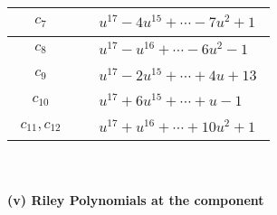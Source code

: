 \documentclass[1p]{elsarticle_modified}
\theoremstyle{definition}
\begin{document}
\begin{tabular}{m{50pt}|m{274pt}}
\hline $$\begin{aligned}c_{7}\end{aligned}$$&$\begin{aligned}
&u^{17}-4 u^{15}+\cdots-7 u^2+1
\end{aligned}$\\
\hline $$\begin{aligned}c_{8}\end{aligned}$$&$\begin{aligned}
&u^{17}- u^{16}+\cdots-6 u^2-1
\end{aligned}$\\
\hline $$\begin{aligned}c_{9}\end{aligned}$$&$\begin{aligned}
&u^{17}-2 u^{15}+\cdots+4 u+13
\end{aligned}$\\
\hline $$\begin{aligned}c_{10}\end{aligned}$$&$\begin{aligned}
&u^{17}+6 u^{15}+\cdots+u-1
\end{aligned}$\\
\hline $$\begin{aligned}c_{11},c_{12}\end{aligned}$$&$\begin{aligned}
&u^{17}+u^{16}+\cdots+10 u^2+1
\end{aligned}$\\
\hline
\end{tabular}\\~\\
\newpage\renewcommand{\arraystretch}{1}
\flushleft \textbf{(v) Riley Polynomials at the component}\newline \\
\end{document}
